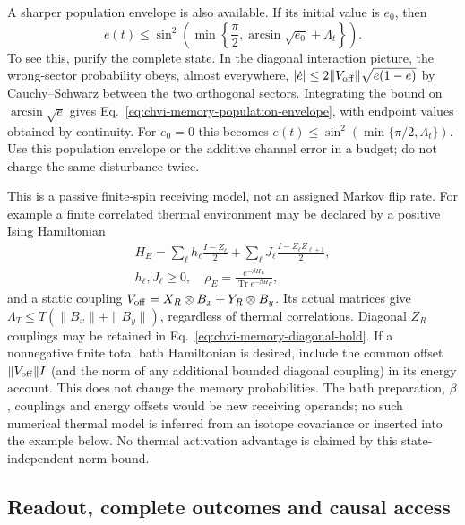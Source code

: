 A sharper population envelope is also available. If its initial value is
$e_0$, then
\begin{equation}
 e(t)\leq
 \sin^2\!\left(\min\left\{\frac\pi2,
                  \arcsin\sqrt{e_0}+\Lambda_t\right\}\right).
\label{eq:chvi-memory-population-envelope}
\end{equation}
To see this, purify the complete state. In the diagonal interaction picture,
the wrong-sector probability obeys, almost everywhere,
$|\dot e|\leq2\|V_{\rm off}\|\sqrt{e(1-e)}$ by Cauchy--Schwarz between
the two orthogonal sectors. Integrating the bound on
$\arcsin\sqrt e$ gives Eq.~\eqref{eq:chvi-memory-population-envelope},
with endpoint values obtained by continuity. For $e_0=0$ this becomes
$e(t)\leq\sin^2(\min\{\pi/2,\Lambda_t\})$.
Use this population envelope or the additive channel error in a budget;
do not charge the same disturbance twice.

This is a passive finite-spin receiving model, not an assigned Markov
flip rate. For example a finite correlated thermal environment may be
declared by a positive Ising Hamiltonian
\begin{equation}
\begin{gathered}
H_E=\sum_\ell h_\ell\frac{I-Z_\ell}{2}
       +\sum_\ell J_\ell\frac{I-Z_\ell Z_{\ell+1}}{2},
 \\
 h_\ell,J_\ell\geq0,
 \quad \rho_E=\frac{e^{-\beta H_E}}{\operatorname{Tr}e^{-\beta H_E}},
\end{gathered}
\end{equation}
and a static coupling $V_{\rm off}=X_R\otimes B_x+Y_R\otimes B_y$.
Its actual matrices give
$\Lambda_T\leq T(\|B_x\|+\|B_y\|)$, regardless of thermal correlations.
Diagonal $Z_R$ couplings may be retained in Eq.~\eqref{eq:chvi-memory-diagonal-hold}.
If a nonnegative finite total bath Hamiltonian is desired, include the
common offset $\|V_{\rm off}\|I$ (and the norm of any additional bounded
diagonal coupling) in its energy account. This does not change the memory
probabilities.
The bath preparation, $\beta$, couplings and energy offsets would be new
receiving operands; no such numerical thermal model is inferred from an
isotope covariance or inserted into the example below. No thermal activation
advantage is claimed by this state-independent norm bound.

\subsection{Readout, complete outcomes and causal access}


